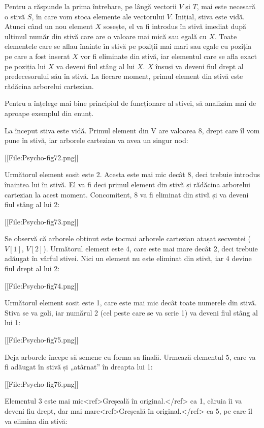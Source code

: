 Pentru a răspunde la prima întrebare, pe lângă vectorii $V$ și $T$, mai este necesară o stivă $S$, în care vom stoca elemente ale vectorului $V$. Inițial, stiva este vidă. Atunci când un nou element $X$ sosește, el va fi introdus în stivă imediat după ultimul număr din stivă care are o valoare mai mică sau egală cu $X$. Toate elementele care se aflau înainte în stivă pe poziții mai mari sau egale cu poziția pe care a fost inserat $X$ vor fi eliminate din stivă, iar elementul care se afla exact pe poziția lui $X$ va deveni fiul stâng al lui $X$. $X$ însuși va deveni fiul drept al predecesorului său în stivă. La fiecare moment, primul element din stivă este rădăcina arborelui cartezian.

Pentru a înțelege mai bine principiul de funcționare al stivei, să analizăm mai de aproape exemplul din enunț.

La început stiva este vidă. Primul element din V are valoarea 8, drept care îl vom pune în stivă, iar arborele cartezian va avea un singur nod:

[[File:Psycho-fig72.png]]

Următorul element sosit este 2. Acesta este mai mic decât 8, deci trebuie introdus înaintea lui în stivă. El va fi deci primul element din stivă și rădăcina arborelui cartezian la acest moment. Concomitent, 8 va fi eliminat din stivă și va deveni fiul stâng al lui 2:

[[File:Psycho-fig73.png]]

Se observă că arborele obținut este tocmai arborele cartezian atașat secvenței ($V[1]$, $V[2]$). Următorul element este 4, care este mai mare decât 2, deci trebuie adăugat în vârful stivei. Nici un element nu este eliminat din stivă, iar 4 devine fiul drept al lui 2:

[[File:Psycho-fig74.png]]

Următorul element sosit este 1, care este mai mic decât toate numerele din stivă. Stiva se va goli, iar numărul 2 (cel peste care se va scrie 1) va deveni fiul stâng al lui 1:

[[File:Psycho-fig75.png]]

Deja arborele începe să semene cu forma sa finală. Urmează elementul 5, care va fi adăugat în stivă și „atârnat” în dreapta lui 1:

[[File:Psycho-fig76.png]]

Elementul 3 este mai mic<ref>Greșeală în original.</ref> ca 1, căruia îi va deveni fiu drept, dar mai mare<ref>Greșeală în original.</ref> ca 5, pe care îl va elimina din stivă:


